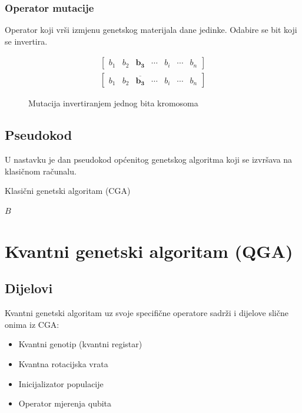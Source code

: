 \documentclass[times, utf8, zavrsni, numeric]{fer}
\begin{document}
\subsubsection{Operator mutacije}
Operator koji vrši izmjenu genetskog materijala dane jedinke. Odabire se bit koji se invertira.
\begin{figure}[htb]
\centering
\begin{align*}
\begin{bmatrix}
b_1 & b_2 & \mathbf{b_3} & \cdots & b_i & \cdots & b_n
\end{bmatrix}\\
\begin{bmatrix}
b_1 & b_2 & \overline{\mathbf{b_3}} & \cdots & b_i & \cdots & b_n
\end{bmatrix}
\end{align*}
\caption{Mutacija invertiranjem jednog bita kromosoma}
\end{figure}

\newpage

\subsection{Pseudokod}
U nastavku je dan pseudokod općenitog genetskog algoritma koji se izvršava na klasičnom računalu.
\begin{algorithm}
\caption{Klasični genetski algoritam (CGA)}
\label{algo:cga}
\begin{algorithmic}
\ENDWHILE
\RETURN $B$
\end{algorithmic}
\end{algorithm}

\newpage

\section{Kvantni genetski algoritam (QGA)}
\subsection{Dijelovi}
Kvantni genetski algoritam uz svoje specifične operatore sadrži i dijelove slične onima iz CGA:
\begin{itemize}
\item Kvantni genotip (kvantni registar)
\item Kvantna rotacijska vrata
\item Inicijalizator populacije
\item Operator mjerenja qubita
\end{itemize}
\end{document}
